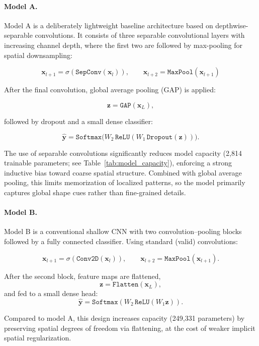 \documentclass{article}
\begin{document}
\paragraph{Model A.}
Model A is a deliberately lightweight baseline architecture based on 
depthwise-separable convolutions. It consists of three separable convolutional 
layers with increasing channel depth, where the first two are followed by 
max-pooling for spatial downsampling:

\[
\mathbf{x}_{l+1}
=
\sigma\!\left(\texttt{SepConv}(\mathbf{x}_l)\right),
\qquad
\mathbf{x}_{l+2} = \texttt{MaxPool}(\mathbf{x}_{l+1})
\]

After the final convolution, global average pooling (GAP) is applied:

\[
\mathbf{z} = \texttt{GAP}(\mathbf{x}_L),
\]

followed by dropout and a small dense classifier:

\[
\hat{\mathbf{y}} =
\texttt{Softmax}\!\big(W_2 \,\texttt{ReLU}(W_1\,\texttt{Dropout}(\mathbf{z}))\big).
\]

The use of separable convolutions significantly reduces model capacity 
(2,814 trainable parameters; see Table~\ref{tab:model_capacity}), enforcing 
a strong inductive bias toward coarse spatial structure. Combined with 
global average pooling, this limits memorization of localized patterns, 
so the model primarily captures global shape cues rather than fine-grained details.

\paragraph{Model B.}
Model B is a conventional shallow CNN with two convolution--pooling blocks
followed by a fully connected classifier. Using standard (valid) convolutions:

\[
\mathbf{x}_{l+1}=\sigma(\texttt{Conv2D}(\mathbf{x}_l)),
\qquad
\mathbf{x}_{l+2}=\texttt{MaxPool}(\mathbf{x}_{l+1}).
\]

After the second block, feature maps are flattened,
\[
\mathbf{z}=\texttt{Flatten}(\mathbf{x}_L),
\]
and fed to a small dense head:
\[
\hat{\mathbf{y}}=\texttt{Softmax}(W_2\,\texttt{ReLU}(W_1\mathbf{z})).
\]

Compared to model A, this design increases capacity (249{,}331 parameters) by
preserving spatial degrees of freedom via flattening, at the cost of weaker
implicit spatial regularization.
\end{document}
